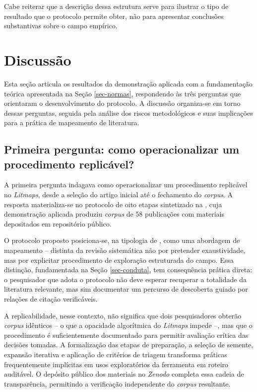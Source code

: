 \documentclass[portuguese]{textolivre}
\begin{document}
	Cabe reiterar que a descrição dessa estrutura serve para ilustrar o tipo de resultado que o protocolo permite obter, não para apresentar conclusões substantivas sobre o campo empírico.

\section{Discussão}\label{sec-secoes}
Esta seção articula os resultados da demonstração aplicada com a fundamentação teórica apresentada na Seção \ref{sec-normas}, respondendo às três perguntas que orientaram o desenvolvimento do protocolo. A discussão organiza-se em torno dessas perguntas, seguida pela análise dos riscos metodológicos e suas implicações para a prática de mapeamento de literatura.

\subsection{Primeira pergunta: como operacionalizar um procedimento replicável?}\label{sec-format-simple}
A primeira pergunta indagava como operacionalizar um procedimento replicável no \textit{Litmaps}, desde a seleção do artigo inicial até o fechamento do \textit{corpus}. A resposta materializa-se no protocolo de oito etapas sintetizado na , cuja demonstração aplicada produziu \textit{corpus} de 58 publicações com materiais depositados em repositório público.

	O protocolo proposto posiciona-se, na tipologia de \textcite{Grant2009}, como uma abordagem de mapeamento – distinta da revisão sistemática não por pretender exaustividade, mas por explicitar procedimento de exploração estruturada do campo. Essa distinção, fundamentada na Seção \ref{sec-conduta}, tem consequência prática direta: o pesquisador que adota o protocolo não deve esperar recuperar a totalidade da literatura relevante, mas sim documentar um percurso de descoberta guiado por relações de citação verificáveis.
    
	A replicabilidade, nesse contexto, não significa que dois pesquisadores obterão \textit{corpus} idênticos – o que a opacidade algorítmica do \textit{Litmaps} impede –, mas que o procedimento é suficientemente documentado para permitir avaliação crítica das decisões tomadas. A formalização das etapas de preparação, a seleção de semente, expansão iterativa e aplicação de critérios de triagem transforma práticas frequentemente implícitas em usos exploratórios da ferramenta em roteiro auditável. O depósito público dos materiais no \textit{Zenodo} \cite{Ribeiro2025} completa essa cadeia de transparência, permitindo a verificação independente do \textit{corpus} resultante.
\end{document}
